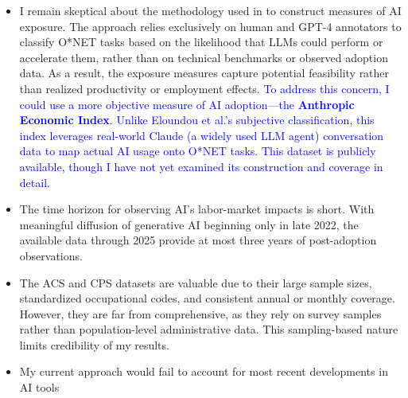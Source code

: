 \documentclass[12pt]{article}
\begin{document}
\begin{itemize}[leftmargin=*]
    \item I remain skeptical about the methodology used in \cite{eloundou2024gpts} to construct measures of AI exposure. The approach relies exclusively on human and GPT-4 annotators to classify O*NET tasks based on the likelihood that LLMs could perform or accelerate them, rather than on technical benchmarks or observed adoption data. As a result, the exposure measures capture potential feasibility rather than realized productivity or employment effects. \textcolor{blue}{To address this concern, I could use a more objective measure of AI adoption—the \textbf{Anthropic Economic Index}. Unlike Eloundou et al.’s subjective classification, this index leverages real-world Claude (a widely used LLM agent) conversation data to map actual AI usage onto O*NET tasks. This dataset is publicly available, though I have not yet examined its construction and coverage in detail.}

    \item The time horizon for observing AI’s labor-market impacts is short. With meaningful diffusion of generative AI beginning only in late 2022, the available data through 2025 provide at most three years of post-adoption observations.

    \item The ACS and CPS datasets are valuable due to their large sample sizes, standardized occupational codes, and consistent annual or monthly coverage. However, they are far from comprehensive, as they rely on survey samples rather than population-level administrative data. This sampling-based nature limits credibility of my results.
    \item My current approach would fail to account for most recent developments in AI tools 

\end{itemize}
\newpage
\end{document}
